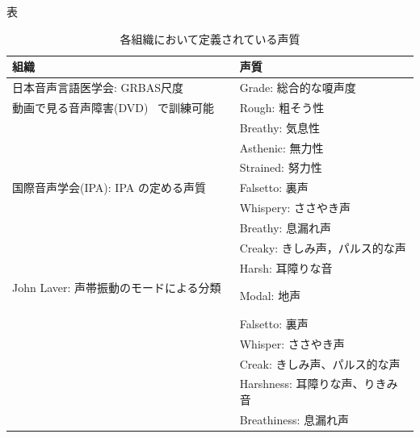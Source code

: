表
\begin{table}[htb]
    \begin{center}
    \caption{各組織において定義されている声質}
    \label{tb:around_voice_quolity}
        \begin{tabular}{|ll|} \hline
            組織                                                 & 声質                           \\ \hline \hline
            日本音声言語医学会: GRBAS尺度 ~\cite{vq_9}           & Grade: 総合的な嗄声度          \\
            動画で見る音声障害(DVD) ~\cite{vq_10}で訓練可能      & Rough: 粗そう性                  \\
                                                                 & Breathy: 気息性                \\
                                                                 & Asthenic: 無力性               \\
                                                                 & Strained: 努力性               \\ \hline
            国際音声学会(IPA): IPA の定める声質 ~\cite{vq_2}     & Falsetto: 裏声                 \\
                                                                 & Whispery: ささやき声           \\
                                                                 & Breathy: 息漏れ声              \\
                                                                 & Creaky: きしみ声，パルス的な声 \\
                                                                 & Harsh: 耳障りな音              \\ \hline
            John Laver: 声帯振動のモードによる分類 ~\cite{vq_11} & Modal: 地声                    \\
                                                                 & Falsetto: 裏声                 \\
                                                                 & Whisper: ささやき声            \\
                                                                 & Creak: きしみ声、パルス的な声  \\
                                                                 & Harshness: 耳障りな声、りきみ音\\
                                                                 & Breathiness: 息漏れ声          \\ \hline
        \end{tabular}
    \end{center}
\end{table}